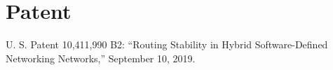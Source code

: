\section{Patent}
\vspace*{-0.75\baselineskip}
\begin{enumerate}[label={[p\arabic*]},noitemsep]
\setcounter{enumi}{0}
\item U. S. Patent 10,411,990 B2: ``Routing Stability in Hybrid Software-Defined Networking Networks,'' September 10, 2019.
\end{enumerate}
\vspace*{0.1cm}